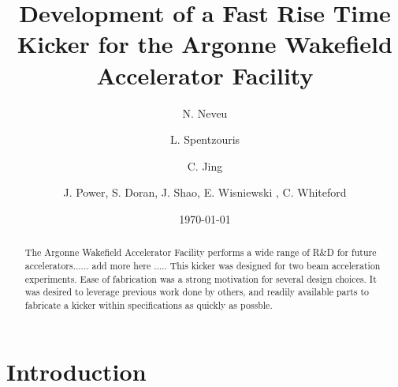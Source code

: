 \documentclass[aps,prab,preprint,groupedaddress,linenumbers]{revtex4-2}
\begin{document}

\title{Development of a Fast Rise Time Kicker for the Argonne Wakefield Accelerator Facility}

\author{N. Neveu}
\author{L. Spentzouris}

\author{C. Jing}

\author{J. Power, S. Doran, J. Shao, E. Wisniewski , C. Whiteford}


\date{\today}

\begin{abstract}
The Argonne Wakefield Accelerator Facility performs a wide range of R\&D for 
future accelerators...... add more here .....
This kicker was designed for two beam acceleration experiments.
Ease of fabrication was a strong motivation for several design choices.
It was desired to leverage previous work done by others, and readily available parts
to fabricate a kicker within specifications as quickly as possble.
\end{abstract}


\maketitle

\section{Introduction}
\end{document}
